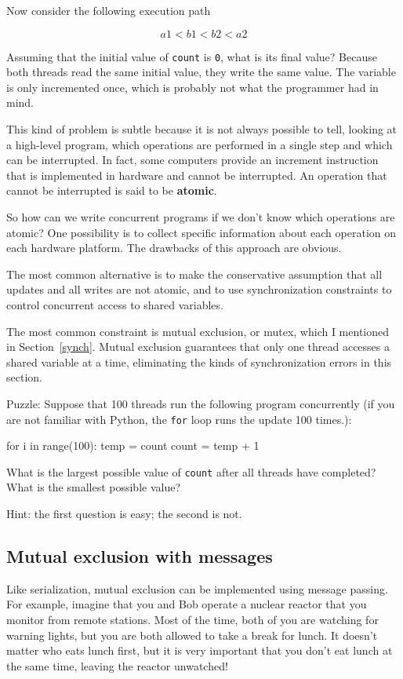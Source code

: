 \documentclass{book}
\begin{document}
Now consider the following execution path

\[  a1 < b1 < b2 < a2  \]

Assuming that the
initial value of {\tt count} is {\tt 0},
what is its final value?  Because
both threads read the same initial value, they write
the same value.  The variable is only incremented once, which
is probably not what the programmer had in mind.

This kind of problem is subtle because it is not always possible to
tell, looking at a high-level program, which operations are
performed in a single step and which can be interrupted.
In fact, some computers provide an increment instruction that
is implemented in hardware and cannot be interrupted.
An operation that cannot be interrupted is said to be
    {\bf atomic}.

So how can we write concurrent programs if we don't know which
operations are atomic?  One possibility is to collect specific
information about each operation on each hardware platform.
The drawbacks of this approach are obvious.

The most common alternative is to make the conservative
assumption that all updates and all writes are not atomic,
and to use synchronization constraints to control concurrent
access to shared variables.

The most common constraint is mutual exclusion, or mutex,
which I mentioned in Section~\ref{synch}.  Mutual exclusion guarantees
that only one thread accesses a shared variable at a time,
eliminating the kinds of synchronization errors in this section.

Puzzle: Suppose that 100 threads run the following program concurrently
(if you are not familiar with Python, the {\tt for} loop runs the update
100 times.):

\begin{unbreakable}
for i in range(100):
    temp = count
    count = temp + 1
\end{unbreakable}

What is the largest possible value of {\tt count} after all threads
have completed?  What is the smallest possible value?

Hint: the first question is easy; the second is not.

\subsection {Mutual exclusion with messages}

Like serialization, mutual exclusion
can be implemented using message passing.  For example, imagine that
you and Bob operate a nuclear reactor that you monitor from remote
stations.  Most of the time, both of you are watching for warning
lights, but you are both allowed to take a break for lunch.  It
doesn't matter who eats lunch first, but it is very important that
you don't eat lunch at the same time, leaving the reactor unwatched!
\end{document}
